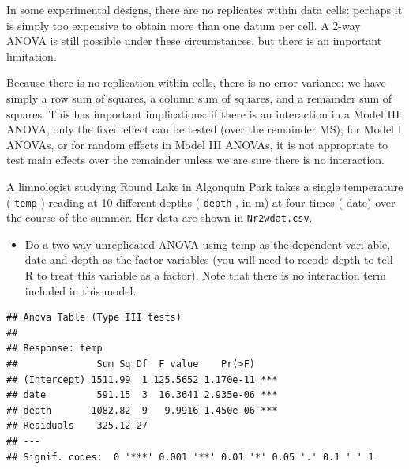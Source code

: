 \documentclass[
  12pt,
]{book}
\makeatletter
\newenvironment{Shaded}{\begin{snugshade}}{\end{snugshade}}
\newcommand{\DataTypeTok}[1]{\textcolor[rgb]{0.13,0.29,0.53}{#1}}
\newcommand{\DecValTok}[1]{\textcolor[rgb]{0.00,0.00,0.81}{#1}}
\newcommand{\KeywordTok}[1]{\textcolor[rgb]{0.13,0.29,0.53}{\textbf{#1}}}
\newcommand{\NormalTok}[1]{#1}
\newcommand{\OperatorTok}[1]{\textcolor[rgb]{0.81,0.36,0.00}{\textbf{#1}}}
\newcommand{\StringTok}[1]{\textcolor[rgb]{0.31,0.60,0.02}{#1}}
\providecommand{\tightlist}{%
  \setlength{\itemsep}{0pt}\setlength{\parskip}{0pt}}
\newenvironment{kframe}{%
\medskip{}
\setlength{\fboxsep}{.8em}
\def\at@end@of@kframe{}%
\ifinner\ifhmode%
 \def\at@end@of@kframe{\end{minipage}}%
 \begin{minipage}{\columnwidth}%
\fi\fi%
\def\FrameCommand##1{\hskip\@totalleftmargin \hskip-\fboxsep
\colorbox{incolor}{##1}\hskip-\fboxsep
    \hskip-\linewidth \hskip-\@totalleftmargin \hskip\columnwidth}%
\MakeFramed {\advance\hsize-\width
  \@totalleftmargin\z@ \linewidth\hsize
  \@setminipage}}%
{\par\unskip\endMakeFramed%
\at@end@of@kframe}
\newenvironment{rmdblock}[1]
 {
 \begin{itemize}
 \renewcommand{\labelitemi}{
   \raisebox{-.7\height}[0pt][0pt]{
     {\setkeys{Gin}{width=3em,keepaspectratio}\texttt{[image: images/\#1]}}
   }
 }
 \begin{kframe}
 \setlength{\fboxsep}{1em}
 \item
 }
 {
 \end{kframe}
 \end{itemize}
 }
\newenvironment{rmdwarning}
  {\begin{rmdblock}{warning}}
  {\end{rmdblock}}
\makeatother
\begin{document}
In some experimental designs, there are no replicates within data cells: perhaps it is simply too expensive to obtain more than one datum per cell. A 2-way ANOVA is still possible under these circumstances, but there is an important limitation.

\begin{rmdwarning}
Because there is no replication within cells, there is no error variance: we have simply a row sum of squares, a column sum of squares, and a remainder sum of squares. This has important implications: if there is an interaction in a Model III ANOVA, only the fixed effect can be tested (over the remainder MS); for Model I ANOVAs, or for random effects in Model III ANOVAs, it is not appropriate to test main effects over the remainder unless we are sure there is no interaction.
\end{rmdwarning}

A limnologist studying Round Lake in Algonquin Park takes a single temperature ( \texttt{temp} ) reading at 10 different depths ( \texttt{depth} , in m) at four times ( date) over the course of the summer. Her data are shown in \texttt{Nr2wdat.csv}.

\begin{itemize}
\tightlist
\item
  Do a two-way unreplicated ANOVA using temp as the dependent vari able, date and depth as the factor variables (you will need to recode depth to tell R to treat this variable as a factor). Note that there is no interaction term included in this model.
\end{itemize}

\begin{Shaded}
\end{Shaded}

\begin{verbatim}
## Anova Table (Type III tests)
## 
## Response: temp
##              Sum Sq Df  F value    Pr(>F)    
## (Intercept) 1511.99  1 125.5652 1.170e-11 ***
## date         591.15  3  16.3641 2.935e-06 ***
## depth       1082.82  9   9.9916 1.450e-06 ***
## Residuals    325.12 27                       
## ---
## Signif. codes:  0 '***' 0.001 '**' 0.01 '*' 0.05 '.' 0.1 ' ' 1
\end{verbatim}
\end{document}
